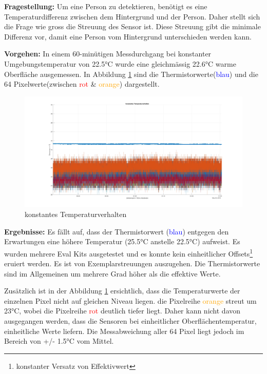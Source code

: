 \textbf{Fragestellung:} Um eine Person zu detektieren, benötigt es eine Temperaturdifferenz zwischen dem Hintergrund und der Person. Daher stellt sich die Frage wie gross die Streuung des Sensor ist. Diese Streuung gibt die minimale Differenz vor, damit eine Person vom Hintergrund unterschieden werden kann.

\textbf{Vorgehen:} In einem 60-minütigen Messdurchgang bei konstanter Umgebungstemperatur von 22.5°C wurde eine gleichmässig 22.6°C warme Oberfläche ausgemessen. In Abbildung \ref{fig:temperaturverhalten} sind die Thermistorwerte(\textcolor{blue}{blau}) und die 64 Pixelwerte(zwischen \textcolor{red}{rot} \& \textcolor{orange}{orange}) dargestellt.
\begin{figure}[H]
	\centering
	\includegraphics[width=1.0\textwidth]{fig/Temperaturverhalten}
	\caption[konstantes Temperaturverhalten]{konstantes Temperaturverhalten}
	\label{fig:temperaturverhalten}
\end{figure}

\textbf{Ergebnisse:} Es fällt auf, dass  der Thermistorwert (\textcolor{blue}{blau}) entgegen den Erwartungen eine höhere Temperatur (25.5°C anstelle 22.5°C) aufweist. Es wurden mehrere Eval Kits ausgetestet und es konnte kein einheitlicher Offsets\footnote[13]{konstanter Versatz von Effektivwert} eruiert werden. Es ist von Exemplarstreuungen auszugehen. Die Thermistorwerte sind im Allgemeinen um mehrere Grad höher als die effektive Werte. 

Zusätzlich ist in der Abbildung \ref{fig:temperaturverhalten} ersichtlich, dass die Temperaturwerte der einzelnen Pixel nicht auf gleichen Niveau liegen. die Pixelreihe \textcolor{orange}{orange} streut um 23°C, wobei die Pixelreihe \textcolor{red}{rot} deutlich tiefer liegt. Daher kann nicht davon ausgegangen werden, dass die Sensoren bei einheitlicher Oberflächentemperatur, einheitliche Werte liefern. Die Messabweichung aller 64 Pixel liegt jedoch im Bereich von +/- 1.5°C vom Mittel. 

